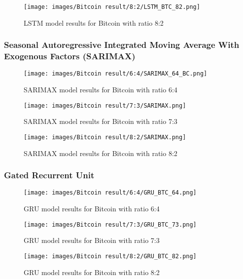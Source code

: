 \documentclass{ieeeojies}
\begin{document}
\begin{figure}[H]
  \centering
  \texttt{[image: images/Bitcoin result/8:2/LSTM\_BTC\_82.png]}
  \caption{LSTM model results for Bitcoin with ratio 8:2}
  \label{fig:lstm_btc_82}
\end{figure}
\subsubsection{Seasonal Autoregressive Integrated
Moving Average With Exogenous Factors
(SARIMAX)}
\begin{figure}[H]
  \centering
 \texttt{[image: images/Bitcoin result/6:4/SARIMAX\_64\_BC.png]}
  \caption{SARIMAX model results for Bitcoin 
  with ratio 6:4}
  \label{fig:SARIMAX_64_BC}
\end{figure}

\begin{figure}[H]
  \centering
  \texttt{[image: images/Bitcoin result/7:3/SARIMAX.png]}
  \caption{SARIMAX model results for Bitcoin with ratio 7:3}
  \label{fig:SARIMAX_73_BC}
\end{figure}

\begin{figure}[H]
  \centering
   \texttt{[image: images/Bitcoin result/8:2/SARIMAX.png]}
  \caption{SARIMAX model results for Bitcoin with ratio 8:2}
  \label{fig:SARIMAX_82_BC}
\end{figure}
  
   
\subsubsection{Gated Recurrent Unit}

\begin{figure}[H]
  \centering
  \texttt{[image: images/Bitcoin result/6:4/GRU\_BTC\_64.png]}
  \caption{GRU model results for Bitcoin with ratio 6:4}
  \label{fig:gru_btc_64}
\end{figure}


\begin{figure}[H]
  \centering
  \texttt{[image: images/Bitcoin result/7:3/GRU\_BTC\_73.png]}
  \caption{GRU model results for Bitcoin with ratio 7:3}
  \label{fig:gru_btc_73}
\end{figure}

\begin{figure}[H]
  \centering
  \texttt{[image: images/Bitcoin result/8:2/GRU\_BTC\_82.png]}
  \caption{GRU model results for Bitcoin with ratio 8:2}
  \label{fig:gru_btc_82}
\end{figure}
\end{document}
